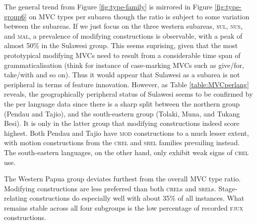The general trend from Figure \ref{fig:type-family} is mirrored in Figure \ref{fig:type-group6} on MVC types per subarea though the ratio is subject to some variation between the subareas. If we just focus on the three western subareas, \textsc{sul}, \textsc{nus}, and \textsc{mal}, a prevalence of modifying constructions is observable, with a peak of almost 50\% in the Sulawesi group. This seems suprising, given that the most prototypical modifying MVCs need to result from a considerable time span of grammaticalisation (think for instance of case-marking MVCs such as give/for, take/with and so on). Thus it would appear that Sulawesi as a subarea is not peripheral in terms of feature innovation. However, as Table \ref{table:MVCperlang} reveals, the geographically peripheral status of Sulawesi seems to be confirmed by the per language data since there is a sharp split between the northern group (Pendau and Tajio), and the south-eastern group (Tolaki, Muna, and Tukang Besi). It is only in the latter group that modifying constructions indeed score highest. Both Pendau and Tajio have \textsc{mod} constructions to a much lesser extent, with motion constructions from the \textsc{crel} and \textsc{srel} families prevailing instead. The south-eastern languages, on the other hand, only exhibit weak signs of \textsc{crel} use.

The Western Papua group deviates furthest from the overall MVC type ratio. Modifying constructions are less preferred than both \textsc{crel}s and \textsc{srel}s. Stage-relating constructions do especially well with about 35\% of all instances. What remains stable across all four subgroups is the low percentage of recorded \textsc{fjux} constructions.

